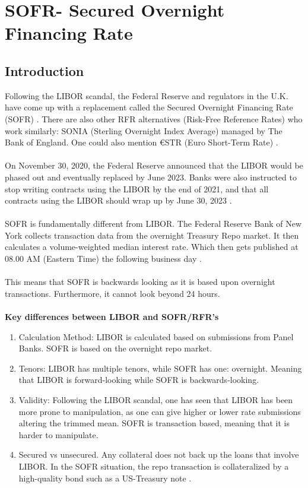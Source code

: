 \chapter{SOFR- Secured Overnight Financing Rate}
\label{chp_SOFR}

\section{Introduction}
Following the LIBOR scandal, the Federal Reserve and regulators in the U.K. have come up with a replacement called the Secured Overnight Financing Rate (SOFR) .
There are also other RFR alternatives (Risk-Free Reference Rates)  who work similarly: SONIA (Sterling Overnight Index Average) 
 managed by The Bank of England. One could also mention €STR (Euro Short-Term Rate) 
\cite{CME_SOFR}.
\\~\\
On November 30, 2020, the Federal Reserve announced that the LIBOR would be phased out and eventually replaced by June 2023. Banks were also instructed to stop writing contracts using the LIBOR by the end of 2021, and that all contracts using the LIBOR should wrap up by June 30, 2023 \cite{hayes_2022}.
\\~\\ 
SOFR is fundamentally different from LIBOR. The Federal Reserve Bank of New York collects transaction data from the overnight Treasury Repo market. It then calculates a volume-weighted median interest rate. Which then gets published at 08.00 AM (Eastern Time) the following business day \cite{ARRC_SOFR}.
\\~\\ 
This means that SOFR is backwards looking as it is based upon overnight transactions. Furthermore, it cannot look beyond 24 hours.  
\\~\\
\textbf{Key differences between LIBOR and SOFR/RFR's}

\begin{enumerate}
    \item Calculation Method: LIBOR is calculated based on submissions from Panel Banks. SOFR is based on the overnight repo market. 
    \item Tenors: LIBOR has multiple tenors, while SOFR has one: overnight. Meaning that LIBOR is forward-looking while SOFR is backwards-looking. 
    \item Validity: Following the LIBOR scandal, one has seen that LIBOR has been more prone to manipulation, as one can give higher or lower rate submissions altering the trimmed mean. SOFR is transaction based, meaning that it is harder to manipulate. 
    \item Secured vs unsecured. Any collateral does not back up the loans that involve LIBOR. In the SOFR situation, the repo transaction is collateralized by a high-quality bond such as a US-Treasury note \cite{huggins2022sofr}. 
\end{enumerate}

